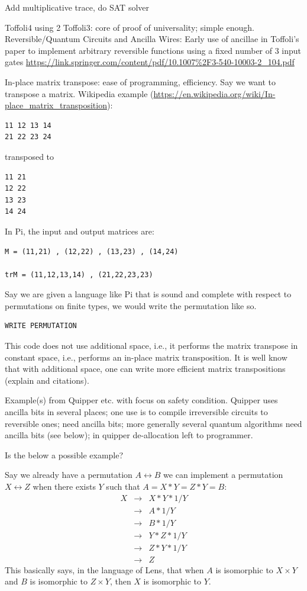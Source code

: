 \documentclass[sigplan,10pt,review,anonymous]{acmart}
\begin{document}
Add multiplicative trace, do SAT solver

Toffoli4 using 2 Toffoli3: core of proof of universality; simple
enough. Reversible/Quantum Circuits and Ancilla Wires: Early use of
ancillae in Toffoli's paper to implement arbitrary reversible
functions using a fixed number of 3 input gates
\url{https://link.springer.com/content/pdf/10.1007%2F3-540-10003-2_104.pdf}

In-place matrix transpose: ease of programming, efficiency. Say we
want to transpose a matrix. Wikipedia example
(\url{https://en.wikipedia.org/wiki/In-place_matrix_transposition}):
\begin{verbatim}
11 12 13 14 
21 22 23 24 
\end{verbatim}
transposed to
\begin{verbatim}
11 21
12 22
13 23
14 24
\end{verbatim}
In Pi, the input and output matrices are:
\begin{verbatim}
M = (11,21) , (12,22) , (13,23) , (14,24) 

trM = (11,12,13,14) , (21,22,23,23) 
\end{verbatim}
Say we are given a language like Pi that is sound and complete with
respect to permutations on finite types, we would write the
permutation like so.
\begin{verbatim}
WRITE PERMUTATION
\end{verbatim}
This code does not use additional space, i.e., it performs the matrix
transpose in constant space, i.e., performs an in-place matrix
transposition. It is well know that with additional space, one can
write more efficient matrix transpositions (explain and citations).

Example(s) from Quipper etc. with focus on safety condition. Quipper
uses ancilla bits in several places; one use is to compile
irreversible circuits to reversible ones; need ancilla bits; more
generally several quantum algorithms need ancilla bits (see below); in
quipper de-allocation left to programmer.

Is the below a possible example?

Say we already have a permutation $A \leftrightarrow B$
we can implement a permutation $X \leftrightarrow Z$ 
when there exists $Y$ such that $A = X * Y = Z * Y = B$:
\[\begin{array}{rcl}
X &\rightarrow& X * Y * 1/Y \\
  &\rightarrow& A * 1/Y \\
  &\rightarrow&  B * 1/Y \\
  &\rightarrow&  Y * Z * 1/Y \\
  &\rightarrow&  Z * Y * 1/Y \\
  &\rightarrow&  Z
\end{array}\]
This basically says, in the language of Lens, that
when $A$ is isomorphic to $X \times Y$ and
$B$ is isomorphic to $Z \times Y$, then
$X$ is isomorphic to $Y$.
\end{document}
